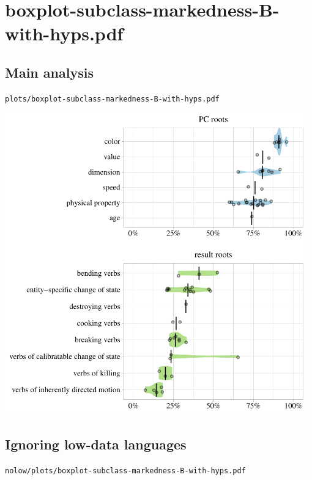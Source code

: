 \eject

\section{boxplot-subclass-markedness-B-with-hyps.pdf}

\subsection{Main analysis}

\texttt{plots/boxplot-subclass-markedness-B-with-hyps.pdf}

\includegraphics[width=0.98\textwidth]{../plots/boxplot-subclass-markedness-B-with-hyps.pdf}

\subsection{Ignoring low-data languages}

\texttt{nolow/plots/boxplot-subclass-markedness-B-with-hyps.pdf}

